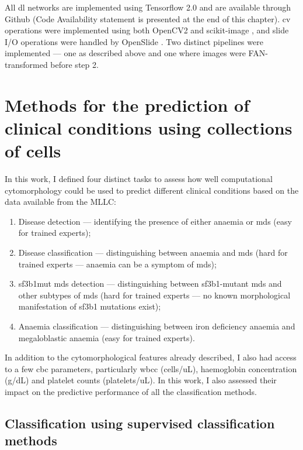 All \ac{dl} networks are implemented using Tensorflow 2.0 \cite{tensorflow2015-whitepaper} and are available through Github (Code Availability statement is presented at the end of this chapter). \Ac{cv} operations were implemented using both OpenCV2 \cite{opencv_library} and scikit-image \cite{van2014scikit}, and slide I/O operations were handled by OpenSlide \cite{Goode2013-zs}. Two distinct pipelines were implemented --- one as described above and one where images were FAN-transformed before step 2.

\section{Methods for the prediction of clinical conditions using collections of cells}

In this work, I defined four distinct tasks to assess how well computational cytomorphology could be used to predict different clinical conditions based on the data available from the MLLC:

\begin{enumerate}
    \item Disease detection --- identifying the presence of either anaemia or \ac{mds} (easy for trained experts);
    \item Disease classification --- distinguishing between anaemia and \ac{mds} (hard for trained experts --- anaemia can be a symptom of \ac{mds});
    \item \ac{sf3b1}mut \ac{mds} detection --- distinguishing between \ac{sf3b1}-mutant \ac{mds} and other subtypes of \ac{mds} (hard for trained experts --- no known morphological manifestation of \ac{sf3b1} mutations exist);
    \item Anaemia classification --- distinguishing between iron deficiency anaemia and megaloblastic anaemia (easy for trained experts).
\end{enumerate}

In addition to the cytomorphological features already described, I also had access to a few \ac{cbc} parameters, particularly \ac{wbcc} (cells/uL), haemoglobin concentration (g/dL) and platelet counts (platelets/uL). In this work, I also assessed their impact on the predictive performance of all the classification methods.

\subsection{Classification using supervised classification methods}

